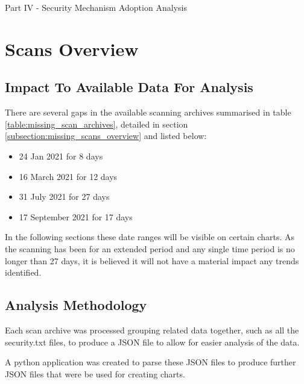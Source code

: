 \documentclass{mscreport}
\begin{document}
\newpage

\vspace*{\fill}
\begin{center}
\begin{huge}
Part IV - Security Mechanism Adoption Analysis
\end{huge}
\end{center}
\vspace{\fill}

\newpage

\section{Scans Overview}
\label{section:scans_overview}

\subsection{Impact To Available Data For Analysis}

There are several gaps in the available scanning archives summarised in table \ref{table:missing_scan_archives}, detailed in section \ref{subsection:missing_scans_overview} and listed below:

\begin{itemize}
	\setlength\itemsep{0.1em}
    \item 24 Jan 2021 for 8 days
    \item 16 March 2021 for 12 days
    \item 31 July 2021 for 27 days
    \item 17 September 2021 for 17 days
\end{itemize}

\noindent
In the following sections these date ranges will be visible on certain charts. As the scanning has been for an extended period and any single time period is no longer than 27 days, it is believed it will not have a material impact any trends identified.


\subsection{Analysis Methodology}

Each scan archive was processed grouping related data together, such as all the security.txt files, to produce a JSON file to allow for easier analysis of the data.

\vspace{0.3cm} \noindent
A python application was created to parse these JSON files to produce further JSON files that were be used for creating charts.
\end{document}
